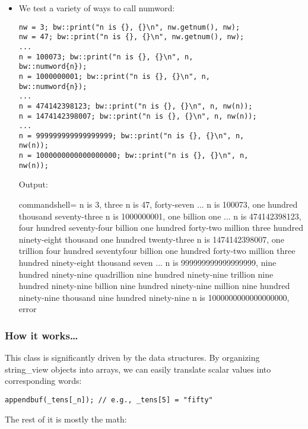 \begin{itemize}
\begin{tcblisting}{commandshell={}}
n is 0, zero
\end{tcblisting}

\item 
We test a variety of ways to call numword:

\begin{lstlisting}[style=styleCXX]
nw = 3; bw::print("n is {}, {}\n", nw.getnum(), nw);
nw = 47; bw::print("n is {}, {}\n", nw.getnum(), nw);
...
n = 100073; bw::print("n is {}, {}\n", n,
bw::numword{n});
n = 1000000001; bw::print("n is {}, {}\n", n,
bw::numword{n});
...
n = 474142398123; bw::print("n is {}, {}\n", n, nw(n));
n = 1474142398007; bw::print("n is {}, {}\n", n, nw(n));
...
n = 999999999999999999; bw::print("n is {}, {}\n", n,
nw(n));
n = 1000000000000000000; bw::print("n is {}, {}\n", n,
nw(n));
\end{lstlisting}

Output:

\begin{tcblisting}{commandshell={}}
n is 3, three
n is 47, forty-seven
...
n is 100073, one hundred thousand seventy-three
n is 1000000001, one billion one
...
n is 474142398123, four hundred seventy-four billion
one hundred forty-two million three hundred ninety-eight
thousand one hundred twenty-three
n is 1474142398007, one trillion four hundred seventyfour billion one hundred forty-two million three hundred
ninety-eight thousand seven
...
n is 999999999999999999, nine hundred ninety-nine
quadrillion nine hundred ninety-nine trillion nine
hundred ninety-nine billion nine hundred ninety-nine
million nine hundred ninety-nine thousand nine hundred
ninety-nine
n is 1000000000000000000, error
\end{tcblisting}
\end{itemize}

\subsubsection{How it works…}

This class is significantly driven by the data structures. By organizing string\_view objects into arrays, we can easily translate scalar values into corresponding words:

\begin{lstlisting}[style=styleCXX]
appendbuf(_tens[_n]); // e.g., _tens[5] = "fifty"
\end{lstlisting}

The rest of it is mostly the math:

